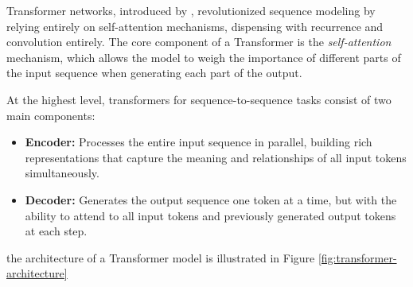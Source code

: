 Transformer networks, introduced by \cite{vaswani2017attention}, revolutionized sequence modeling by relying entirely on self-attention mechanisms, dispensing with recurrence and convolution entirely. The core component of a Transformer is the \textit{self-attention} mechanism, which allows the model to weigh the importance of different parts of the input sequence when generating each part of the output.

At the highest level, transformers for sequence-to-sequence tasks consist of two main components:
\begin{itemize}
    \item \textbf{Encoder:} Processes the entire input sequence in parallel, building rich representations that capture the meaning and relationships of all input tokens simultaneously.
    \item \textbf{Decoder:} Generates the output sequence one token at a time, but with the ability to attend to all input tokens and previously generated output tokens at each step.
\end{itemize}

the architecture of a Transformer model is illustrated in Figure \ref{fig:transformer-architecture}

